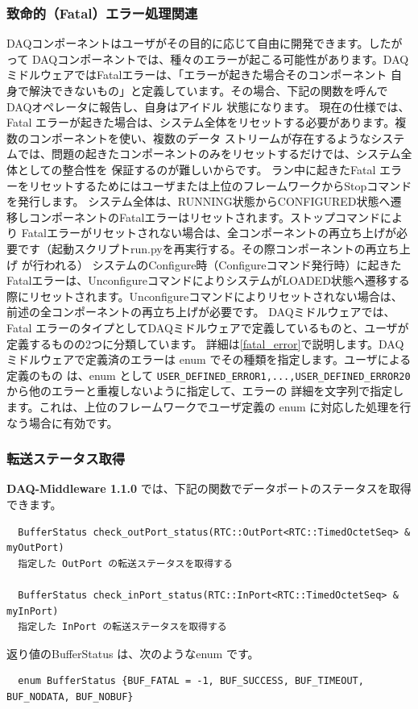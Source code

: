 \documentclass[a4j,10pt,dvips,onecolumn,oneside,final]{jarticle}%
\newcommand {\daqmwcurrent} {
	{\bf DAQ-Middleware 1.1.0}
}
\begin{document}
\subsubsection{致命的（Fatal）エラー処理関連}\label{fatal}
DAQコンポーネントはユーザがその目的に応じて自由に開発できます。したがって
DAQコンポーネントでは、種々のエラーが起こる可能性があります。DAQミドルウェアではFatalエラーは、「エラーが起きた場合そのコンポーネント
自身で解決できないもの」と定義しています。その場合、下記の関数を呼んでDAQオペレータに報告し、自身はアイドル
状態になります。
現在の仕様では、Fatal エラーが起きた場合は、システム全体をリセットする必要があります。複数のコンポーネントを使い、複数のデータ
ストリームが存在するようなシステムでは、問題の起きたコンポーネントのみをリセットするだけでは、システム全体としての整合性を
保証するのが難しいからです。
ラン中に起きたFatal エラーをリセットするためにはユーザまたは上位のフレームワークからStopコマンドを発行します。
システム全体は、RUNNING状態からCONFIGURED状態へ遷移しコンポーネントのFatalエラーはリセットされます。ストップコマンドにより
Fatalエラーがリセットされない場合は、全コンポーネントの再立ち上げが必要です（起動スクリプトrun.pyを再実行する。その際コンポーネントの再立ち上げ
が行われる）
システムのConfigure時（Configureコマンド発行時）に起きたFatalエラーは、UnconfigureコマンドによりシステムがLOADED状態へ遷移する
際にリセットされます。Unconfigureコマンドによりリセットされない場合は、前述の全コンポーネントの再立ち上げが必要です。
DAQミドルウェアでは、Fatal エラーのタイプとしてDAQミドルウェアで定義しているものと、ユーザが定義するものの2つに分類しています。
詳細は\ref{fatal_error}で説明します。DAQミドルウェアで定義済のエラーは enum でその種類を指定します。ユーザによる定義のもの
は、enum として \verb|USER_DEFINED_ERROR1,...,USER_DEFINED_ERROR20|から他のエラーと重複しないように指定して、エラーの
詳細を文字列で指定します。これは、上位のフレームワークでユーザ定義の enum に対応した処理を行なう場合に有効です。

\subsubsection{転送ステータス取得}\label{portstat}
\daqmwcurrent{}では、下記の関数でデータポートのステータスを取得できます。
\begin{Verbatim}  
  BufferStatus check_outPort_status(RTC::OutPort<RTC::TimedOctetSeq> & myOutPort) 
  指定した OutPort の転送ステータスを取得する

  BufferStatus check_inPort_status(RTC::InPort<RTC::TimedOctetSeq> & myInPort)
  指定した InPort の転送ステータスを取得する    
\end{Verbatim}
返り値のBufferStatus は、次のようなenum です。
\begin{Verbatim}
  enum BufferStatus {BUF_FATAL = -1, BUF_SUCCESS, BUF_TIMEOUT, BUF_NODATA, BUF_NOBUF}
\end{Verbatim}
\end{document}
